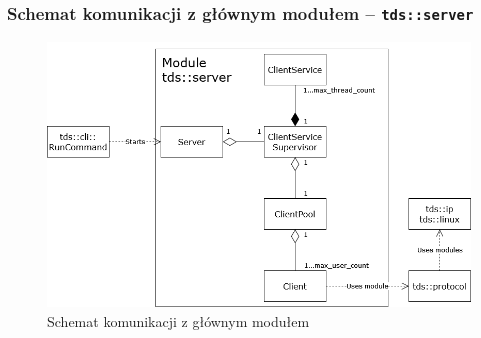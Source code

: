 \documentclass[8pt,a4paper]{article}
\begin{document}
\subsubsection{Schemat komunikacji z głównym modułem -- \texttt{tds::server}}
\begin{figure}[ht]
\centering
\includegraphics[width=1\textwidth]{img/server-com.png}
\caption{\label{fig:server-com.png}Schemat komunikacji z głównym modułem}
\end{figure}
\FloatBarrier

\pagebreak
\end{document}
